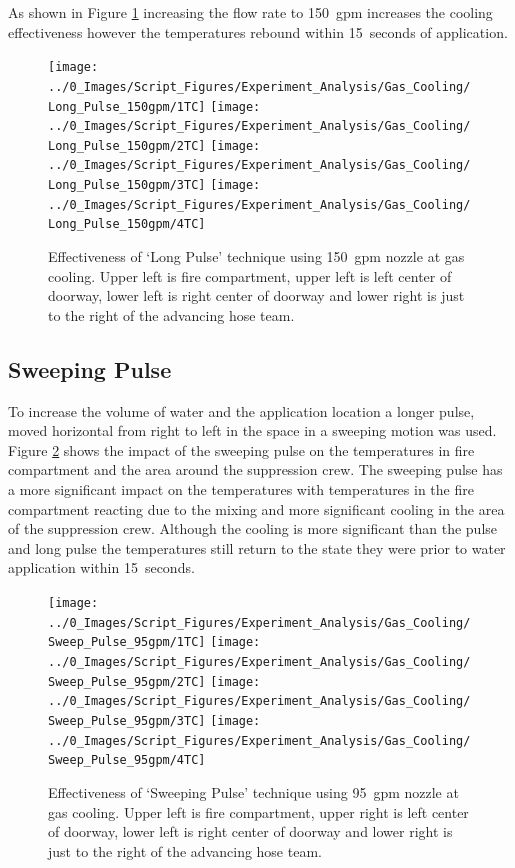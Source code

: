 \documentclass[12pt,oneside]{book}
\begin{document}
As shown in Figure \ref{fig:gas_long_pulse_150} increasing the flow rate to 150~gpm increases the cooling effectiveness however the temperatures rebound within 15~seconds of application. 

\begin{figure}[H]
\centering
\texttt{[image: ../0\_Images/Script\_Figures/Experiment\_Analysis/Gas\_Cooling/Long\_Pulse\_150gpm/1TC]}
\texttt{[image: ../0\_Images/Script\_Figures/Experiment\_Analysis/Gas\_Cooling/Long\_Pulse\_150gpm/2TC]}
\texttt{[image: ../0\_Images/Script\_Figures/Experiment\_Analysis/Gas\_Cooling/Long\_Pulse\_150gpm/3TC]}
\texttt{[image: ../0\_Images/Script\_Figures/Experiment\_Analysis/Gas\_Cooling/Long\_Pulse\_150gpm/4TC]}
\caption[Gas Cooling - Long Pulse 150~gpm]{Effectiveness of `Long Pulse' technique using 150~gpm nozzle at gas cooling. Upper left is fire compartment, upper left is left center of doorway, lower left is right center of doorway and lower right is just to the right of the advancing hose team.}
\label{fig:gas_long_pulse_150}
\end{figure}

\subsection {Sweeping Pulse}
To increase the volume of water and the application location a longer pulse, moved horizontal from right to left in the space in a sweeping motion was used. Figure \ref{fig:gas_sweep_pulse_95} shows the impact of the sweeping pulse on the temperatures in fire compartment and the area around the suppression crew. The sweeping pulse has a more significant impact on the temperatures with temperatures in the fire compartment reacting due to the mixing and more significant cooling in the area of the suppression crew. Although the cooling is more significant than the pulse and long pulse the temperatures still return to the state they were prior to water application within 15~seconds.

\begin{figure}[H]
\centering
\texttt{[image: ../0\_Images/Script\_Figures/Experiment\_Analysis/Gas\_Cooling/Sweep\_Pulse\_95gpm/1TC]}
\texttt{[image: ../0\_Images/Script\_Figures/Experiment\_Analysis/Gas\_Cooling/Sweep\_Pulse\_95gpm/2TC]}
\texttt{[image: ../0\_Images/Script\_Figures/Experiment\_Analysis/Gas\_Cooling/Sweep\_Pulse\_95gpm/3TC]}
\texttt{[image: ../0\_Images/Script\_Figures/Experiment\_Analysis/Gas\_Cooling/Sweep\_Pulse\_95gpm/4TC]}
\caption[Gas Cooling - Sweeping Pulse 95~gpm]{Effectiveness of `Sweeping Pulse' technique using 95~gpm nozzle at gas cooling. Upper left is fire compartment, upper right is left center of doorway, lower left is right center of doorway and lower right is just to the right of the advancing hose team.}
\label{fig:gas_sweep_pulse_95}
\end{figure}
\end{document}
